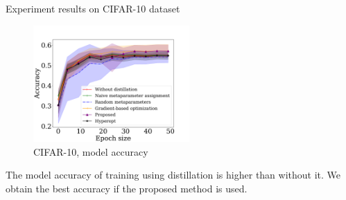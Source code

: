 \documentclass[12pt, aspectratio=169]{beamer}
\begin{document}

\begin{frame}{Experiment results on CIFAR-10 dataset}
\begin{figure}
    \caption*{CIFAR-10, model accuracy}
    \vspace{-1 cm}
    \includegraphics[width=0.53\textwidth]{mini_cifar_accuracy.pdf}
\end{figure}
The model accuracy of training using distillation is higher than without it. We obtain the best accuracy if the proposed method is used.
\end{frame}
\end{document}
